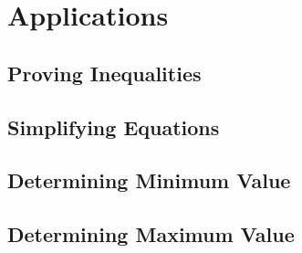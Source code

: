 \documentclass[12pt]{article}
\begin{document}
\section{Applications}
\subsection{Proving Inequalities}

\subsection{Simplifying Equations}
\subsection{Determining Minimum Value}
\subsection{Determining Maximum Value}
\end{document}
